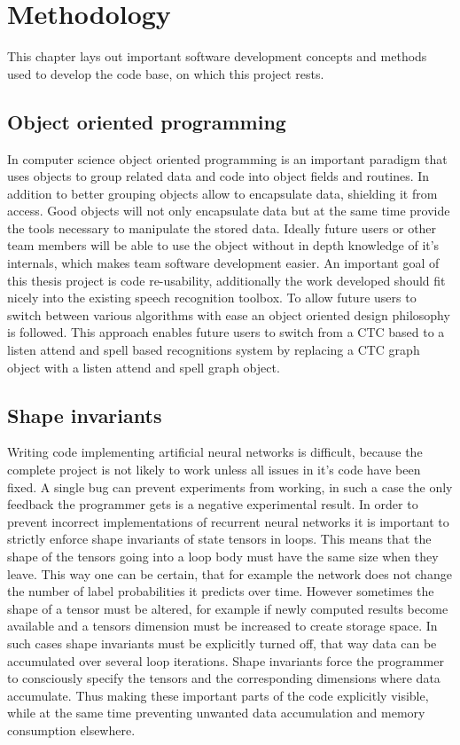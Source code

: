 \chapter{Methodology}
\label{cha:methods}
This chapter lays out important software development concepts and methods used to develop the code base, on which this project rests.

\section{Object oriented programming}
In computer science object oriented programming is an important paradigm that uses objects to group related data and code into object fields and routines. In addition to better grouping objects allow to encapsulate data, shielding it from access. Good objects will not only encapsulate data but at the same time provide the tools necessary to manipulate the stored data. Ideally future users or other team members will be able to use the object without in depth knowledge of it's internals, which makes team software development easier.  
An important goal of this thesis project is code re-usability, additionally the work developed should fit nicely into the existing speech recognition toolbox. To allow future users to switch between various algorithms with ease an object oriented design philosophy is followed. This approach enables future users to switch from a CTC based to a listen attend and spell based recognitions system by replacing a CTC graph object with a listen attend and spell graph object.

\section{Shape invariants}
Writing code implementing artificial neural networks is difficult, because the complete project is not likely to work unless all issues in it's code have been fixed. A single bug can prevent experiments from working, in such a case the only feedback the programmer gets is a negative experimental result. In order to prevent incorrect implementations of recurrent neural networks it is important to strictly enforce shape invariants of state tensors in loops. This means that the shape of the tensors going into a loop body must have the same size when they leave. This way one can be certain, that for example the network does not change the number of label probabilities it predicts over time.
However sometimes the shape of a tensor must be altered, for example if newly computed results become available and a tensors dimension must be increased to create storage space. 
In such cases shape invariants must be explicitly turned off, that way data can be accumulated over several loop iterations. Shape invariants force the programmer to consciously specify the tensors and the corresponding dimensions where data accumulate. Thus making these important parts of the code explicitly visible, while at the same time preventing unwanted data accumulation and memory consumption elsewhere.  


